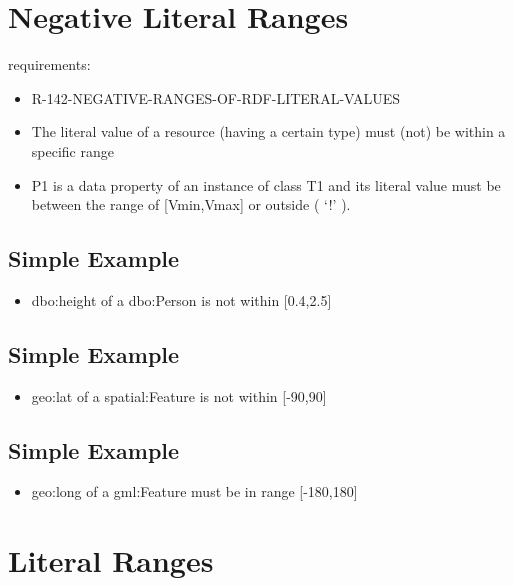\documentclass{llncs}
\begin{document}
\section{Negative Literal Ranges}

requirements:

\begin{itemize}
	\item R-142-NEGATIVE-RANGES-OF-RDF-LITERAL-VALUES
\end{itemize}



\begin{itemize}
	\item The literal value of a resource (having a certain type) must (not) be within a specific range
  \item P1 is a data property of an instance of class T1 and its literal value must be between the range of [Vmin,Vmax] or outside ( ‘!' ).
\end{itemize}

\subsection{Simple Example}

\begin{itemize}
	\item dbo:height of a dbo:Person is not within [0.4,2.5]
\end{itemize}

\subsection{Simple Example}

\begin{itemize}
	\item geo:lat of a spatial:Feature is not within [-90,90]
\end{itemize}

\subsection{Simple Example}

\begin{itemize}
	\item geo:long of a gml:Feature must be in range [-180,180]
\end{itemize}



\section{Literal Ranges}
\end{document}
